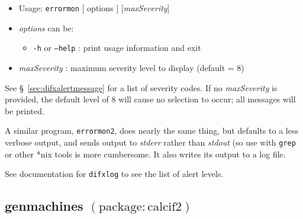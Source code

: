 \begin{itemize}
\item[] Usage: {\tt errormon} $[$ options $]$ $[${\em maxSeverity}$]$
\item[] {\em options} can be:
\begin{itemize}
\item[] {\tt -h} or {\tt --help} : print usage information and exit
\end{itemize}
\item[] {\em maxSeverity} : maximum severity level to display (default = 8)
\end{itemize}

See \S~\ref{sec:difxalertmessage} for a list of severity codes.
If no {\em maxSeverity} is provided, the default level of 8 will cause no selection to occur; all messages will be printed.

A similar program, {\tt errormon2}, does nearly the same thing, but defaults to a less verbose output, and sends output to {\em stderr} rather than {\em stdout} (so use with {\tt grep} or other *nix tools is more cumbersome.
It also writes its output to a log file.

See documentation for {\tt difxlog} to see the list of alert levels.








\subsection{genmachines {\small $\mathrm{(package: calcif2)}$}} \label{sec:genmachines}

